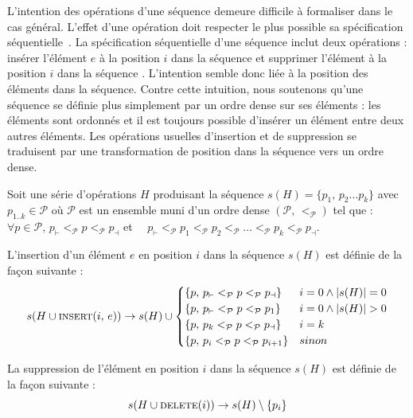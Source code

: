 \noindent L'intention des opérations d'une séquence demeure difficile à
formaliser dans le cas général. L'effet d'une opération doit respecter le plus
possible sa spécification séquentielle~\cite{bieniusa2012brief}. La
spécification séquentielle d'une séquence inclut deux opérations : \og insérer
l'élément $e$ à la position $i$ dans la séquence \fg et \og supprimer l'élément
à la position $i$ dans la séquence \fg. L'intention semble donc liée à la
position des éléments dans la séquence. Contre cette intuition, nous soutenons
qu'une séquence se définie plus simplement par un ordre dense sur ses éléments :
les éléments sont ordonnés et il est toujours possible d'insérer un élément
entre deux autres éléments. Les opérations usuelles d'insertion et de
suppression se traduisent par une transformation de position dans la séquence
vers un ordre dense.

\begin{definition}
  Soit une série d'opérations $H$ produisant la séquence
  $s(H) = \{p_1,\, p_2 \ldots p_k\}$ avec $p_{1..k} \in \mathcal{P}$ où
  $\mathcal{P}$ est un ensemble muni d'un ordre
  dense $(\mathcal{P},\,<_\mathcal{P})$ tel que : \\
  $\forall p\in\mathcal{P},\, p_\vdash <_\mathcal{P} p <_\mathcal{P} p_\dashv $
  \hfill et \ \
  $p_\vdash <_\mathcal{P} p_1 <_\mathcal{P} p_2 <_\mathcal{P} \ldots
  <_\mathcal{P} p_k <_\mathcal{P} p_\dashv$.
  
  \noindent L'insertion d'un élément $e$ en position $i$ dans la séquence $s(H)$
  est définie de la façon suivante :
  \begin{equation}
    s(H \cup \textsc{insert}(i,\, e)) \rightarrow s(H) \cup 
    \begin{cases}
      \{p,\, p_\vdash <_\mathcal{P} p <_\mathcal{P} p_\dashv \} & i = 0 \wedge |s(H)| = 0\\
      \{p,\, p_\vdash <_\mathcal{P} p <_\mathcal{P} p_1 \} & i = 0 \wedge |s(H)|>0\\
      \{p,\, p_k <_\mathcal{P} p <_\mathcal{P} p_\dashv \} & i = k\\
      \{p,\, p_i <_\mathcal{P} p <_\mathcal{P} p_{i+1} \} & sinon
    \end{cases}
  \end{equation}

  \noindent La suppression de l'élément en position $i$ dans la séquence $s(H)$
  est définie de la façon suivante :
  \begin{equation}
    s(H \cup \textsc{delete}(i)) \rightarrow s(H) \setminus \{ p_i \}
  \end{equation}
\end{definition}



